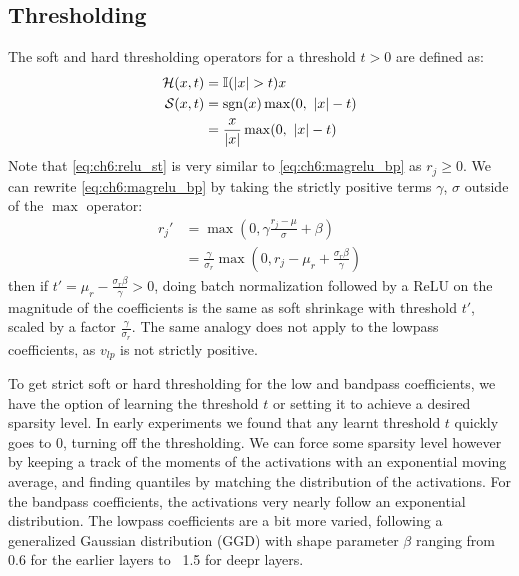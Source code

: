 \subsection{Thresholding}
The soft and hard thresholding operators for a threshold $t>0$ are defined as:
\begin{align}
  \mathcal{H}(x, t) &= \mathbb{I}(|x| > t)x \\
  \mathcal{S}(x, t) &= \mathrm{sgn}(x)\max(0,\ |x| - t)  \\
                    &= \frac{x}{|x|}\max(0,\ |x|-t) \label{eq:ch6:relu_st}
\end{align}
Note that \eqref{eq:ch6:relu_st} is very similar to \eqref{eq:ch6:magrelu_bp} as $r_j \geq 0$. We
can rewrite \eqref{eq:ch6:magrelu_bp} by taking the strictly positive terms
$\gamma$, $\sigma$ outside of the $\max$ operator:
\begin{align}
  r_j' &= \max(0, \gamma \frac{r_j-\mu}{\sigma} + \beta) \\
       &= \frac{\gamma}{\sigma_r}\max\left(0, r_j - \mu_r + \frac{\sigma_r\beta}{\gamma}\right) 
\end{align}
then if $t' = \mu_r - \frac{\sigma_r\beta}{\gamma} > 0$, doing batch
normalization followed by a ReLU on the magnitude of the coefficients is the
same as soft shrinkage with threshold $t'$, scaled by a factor
$\frac{\gamma}{\sigma_r}$.  The same analogy does not apply to the lowpass
coefficients, as $v_{lp}$ is not strictly positive. 

To get strict soft or hard thresholding for the low and bandpass coefficients,
we have the option of learning the threshold $t$ or setting it to achieve a
desired sparsity level. In early experiments we found that any 
learnt threshold $t$ quickly goes to 0, turning off the thresholding. We can
force some sparsity level however by keeping a track of the moments of the activations with an
exponential moving average, and finding quantiles by matching the distribution of
the activations. For the bandpass coefficients, the activations very nearly
follow an exponential distribution. The lowpass coefficients are a bit more
varied, following a generalized Gaussian distribution (GGD) with shape parameter
$\beta$ ranging from 0.6 for the earlier layers to ~1.5 for deepr layers.


